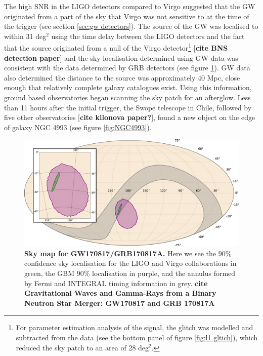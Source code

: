 \documentclass[11pt]{cuthesis}
\begin{document}
The high SNR in the LIGO detectors compared to Virgo suggested that the GW originated from a part of the sky that Virgo was not sensitive to at the time of the trigger (see section \ref{sec:gw detectors}). The source of the GW was localised to within 31 deg$^2$ using the time delay between the LIGO detectors and the fact that the source originated from a null of the Virgo detector\footnote{For parameter estimation analysis of the signal, the glitch was modelled and subtracted from the data (see the bottom panel of figure \ref{fig:l1 gltich}), which reduced the sky patch to an area of 28 deg$^2$.} [\textbf{cite BNS detection paper}] and the sky localisation determined using GW data was consistent with the data determined by GRB detectors (see figure \ref{fig:170817 skymap}). GW data also determined the distance to the source was approximately 40 Mpc, close enough that relatively complete galaxy catalogues exist. Using this information, ground based observatories began scanning the sky patch for an afterglow. Less than 11 hours after the initial trigger, the Swope telescope in Chile, followed by five other observatories  [\textbf{cite kilonova paper?}], found a new object on the edge of galaxy NGC 4993 (see figure \ref{fig:NGC4993}). 


\begin{figure} %
\begin{center}
\includegraphics[width=0.8\linewidth]{gw-grb-170817-sky-map.jpg}
\end{center}
\caption{\textbf{Sky map for GW170817/GRB170817A.} Here we see the 90\% confidence sky localisation for the LIGO and Virgo collaborations in green, the GBM 90\% localisation in purple, and the annulus formed by Fermi and INTEGRAL timing information in grey.  \textbf{cite Gravitational Waves and Gamma-Rays from a Binary Neutron Star Merger: GW170817 and GRB 170817A} }
\label{fig:170817 skymap}
\end{figure}
\end{document}
